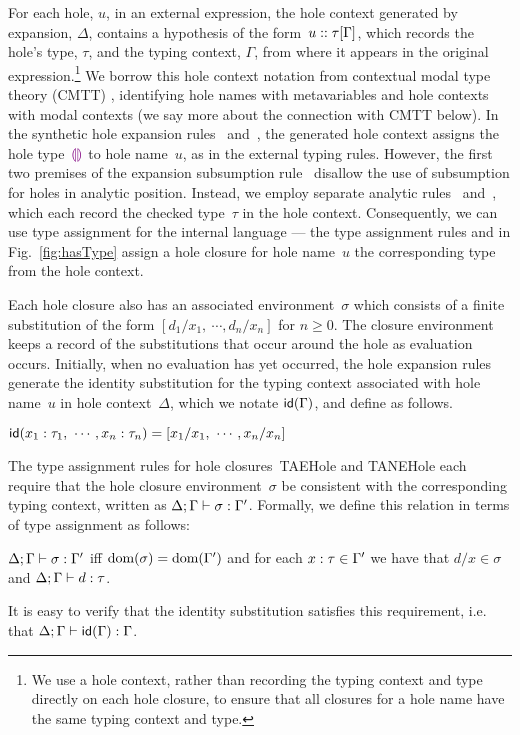 %
For each hole, $u$, in an external expression, the hole context generated by expansion, $\Delta$, contains a hypothesis of the form~$u :: \tau[\Gamma]$, which records the hole's type, $\tau$, and the typing context, $\Gamma$, from where it appears in the original expression.\footnote{
We use a hole context, rather than recording the typing context and type directly on each hole closure, to ensure that all closures for a hole name have the same typing context and type.}
%
We borrow this hole context notation from contextual modal type theory (CMTT) \cite{Nanevski2008}, identifying hole names with metavariables and hole contexts with modal contexts (we say more about the connection with CMTT below).
%
%
In the synthetic hole expansion rules~ and~, the generated hole context assigns the hole type~$\textcolor{violet}{\llparenthesis}\textcolor{violet}{\rrparenthesis}$ to hole name~$u$, as in the external typing rules.
%
However, the first two premises of the expansion subsumption rule~ disallow the use of subsumption for holes in analytic position.
%
Instead, we employ separate analytic rules~ and~, which each record the checked type~$\tau$ in the hole context.
%
Consequently, we can use type assignment for the internal language --- the type assignment rules  and  in Fig.~\ref{fig:hasType} assign a hole closure for hole name~$u$ the corresponding type from the hole context.

Each hole closure also has an associated environment~$\sigma$ which consists of a finite substitution of the form $[d_1/x_1, ~\cdots, d_n/x_n]$ for $n \geq 0$.
%
The closure environment keeps a record of the substitutions that occur around the hole as evaluation occurs.
%
Initially, when no evaluation has yet occurred, the hole expansion rules generate the identity substitution for the typing context associated with hole name~$u$ in hole context~$\Delta$, which we notate $\mathsf{id}(\Gamma)$, and define as follows.
%
\begin{defn} $\mathsf{id}(x_1 : \tau_1, ~\cdots, x_n : \tau_n) = [x_1/x_1, ~\cdots, x_n/x_n]$
\end{defn}
\noindent
The type assignment rules for hole closures~{TAEHole} and {TANEHole} each require that the hole closure environment~$\sigma$ be consistent with the corresponding typing context, written as $\Delta; \Gamma \vdash \sigma : \Gamma'$.
%
Formally, we define this relation in terms of type assignment as follows:
\begin{defn}
$\Delta; \Gamma \vdash \sigma : \Gamma'$ iff $\text{dom}(\sigma) = \text{dom}(\Gamma')$ and for each $x : \tau \in \Gamma'$ we have that $d/x \in \sigma$ and $\Delta; \Gamma \vdash d : \tau$.
\end{defn}
\noindent
It is easy to verify that the identity substitution satisfies this requirement, i.e. that $\Delta; \Gamma \vdash \mathsf{id}(\Gamma) : \Gamma$. 


